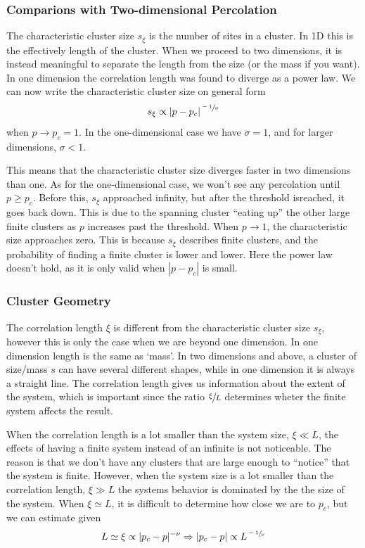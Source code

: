 \documentclass[11pt]{article}
\numberwithin{equation}{section}
\numberwithin{figure}{section}
\begin{document}
\subsubsection{Comparions with Two-dimensional Percolation}
The characteristic cluster size $s_\xi$ is the number of
sites in a cluster. In 1D this is the effectively length of
the cluster. When we proceed to two dimensions,
it is instead meaningful to separate the length from the size 
(or the mass if you want).
In one dimension the correlation length was found to
diverge as a power law.
We can now write the characteristic cluster size on general form
\begin{equation}
    s_{\xi} \propto {|p-p_c|}^{\sfrac{-1}{\sigma}}
\end{equation}
when $p\rightarrow p_c = 1$. 
In the one-dimensional case we have $\sigma = 1$,
and for larger dimensions, $\sigma < 1$.

This means that the characteristic cluster size diverges faster
in two dimensions than one.
As for the one-dimensional case, we won't see any
percolation until $p\geq p_c$. Before this, $s_\xi$ approached 
infinity, but after the threshold isreached, it goes back down.
This is due to the spanning cluster ``eating up'' the other
large finite clusters as $p$ increases past the threshold.
When $p\rightarrow 1$, the characteristic size approaches zero.
This is because $s_\xi$ describes finite clusters,
and the probability of finding a finite cluster is lower and
lower. Here the power law doesn't hold, as
it is only valid when $|p-p_c|$ is small.

\subsubsection{Cluster Geometry}
The correlation length $\xi$ is different from the
characteristic cluster size $s_{\xi}$, however this 
is only the case when we are beyond one dimension.
In one dimension length is the same as `mass'.
In two dimensions and above, a cluster of size/mass $s$
can have several different shapes, while in one dimension
it is always a straight line.
The correlation length gives us information about
the extent of the system, which is important
since the ratio $\sfrac{\xi}{L}$ determines
wheter the finite system affects the result.

When the correlation length is a lot smaller than the system
size, $\xi \ll L$, the effects of having a finite system
instead of an infinite is not noticeable.
The reason is that we don't have any clusters that are large enough
to ``notice'' that the system is finite.
However, when the system size is a lot smaller than the
correlation length, $\xi \gg L$ the systems behavior
is dominated by the the size of the system.
When $\xi\simeq L$, it is difficult to determine how close
we are to $p_c$, but we can estimate given
\begin{equation}
    L \simeq \xi \propto |p_c-p|^{-\nu}
    \Rightarrow |p_c-p| \propto L^{\sfrac{-1}{\nu}}
\end{equation}
\end{document}
